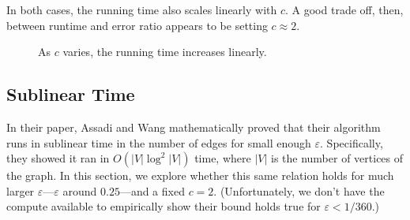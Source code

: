 \documentclass[
]{article}
\begin{document}
In both cases, the running time also scales linearly with {\(c\)}. A good trade off, then, between runtime and error ratio appears to be
setting {\(c \approx 2\)}.
\begin{figure}[!htb]
  \caption{\label{fig:running-time-c-varies}
    As $c$ varies, the running time increases linearly.}
\end{figure}

\hypertarget{sublinear-time}{%
  \subsection{Sublinear Time}\label{sublinear-time}}

In their paper, Assadi and Wang mathematically proved that their algorithm
runs in sublinear time in the number of edges for small enough $\varepsilon$.
Specifically, they showed it ran in $O(|V| \log^2 |V|)$ time, where $|V|$
is the number of vertices of the graph. In this section, we explore whether
this same relation holds for much larger $\varepsilon$---$\varepsilon$ around
$0.25$---and a fixed $c = 2$. (Unfortunately, we don't have the compute available
to empirically show their bound holds true for $\varepsilon < 1 / 360$.)
\end{document}
